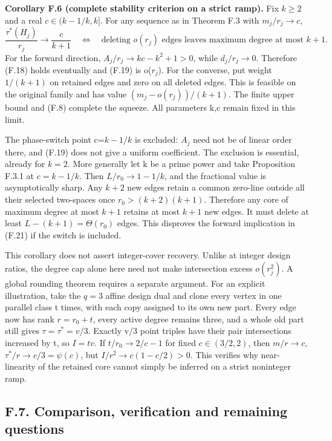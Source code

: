 \documentclass[
  11pt,
]{article}
\begin{document}
\textbf{Corollary F.6 (complete stability criterion on a strict ramp).}
Fix \(k\ge2\) and a real \(c\in(k-1/k,k]\). For any sequence as in
Theorem F.3 with \(m_j/r_j\to c\), \[
 \frac{\tau^*(H_j)}{r_j}\longrightarrow\frac{c}{k+1}
 \quad\Longleftrightarrow\quad
 \text{deleting }o(r_j)\text{ edges leaves maximum degree at most }k+1.
                                                               \tag{F.21}
\] For the forward direction, \(A_j/r_j\to kc-k^2+1>0\), while
\(d_j/r_j\to0\). Therefore (F.18) holds eventually and (F.19) is
o(\(r_j\)). For the converse, put weight \(1/(k+1)\) on retained edges
and zero on all deleted edges. This is feasible on the original family
and has value \((m_j-o(r_j))/(k+1)\). The finite upper bound and (F.8)
complete the squeeze. All parameters k,c remain fixed in this limit.

The phase-switch point c=\(k-1/k\) is excluded: \(A_j\) need not be of
linear order there, and (F.19) does not give a uniform coefficient. The
exclusion is essential, already for \(k=2\). More generally let k be a
prime power and take Proposition F.3.1 at \(c=k-1/k\). Then
\(L/r_0\to1-1/k\), and the fractional value is asymptotically sharp. Any
\(k+2\) new edges retain a common zero-line outside all their selected
two-spaces once \(r_0>(k+2)(k+1)\). Therefore any core of maximum degree
at most \(k+1\) retains at most \(k+1\) new edges. It must delete at
least \(L-(k+1)=\Theta(r_0)\) edges. This disproves the forward
implication in (F.21) if the switch is included.

This corollary does not assert integer-cover recovery. Unlike at integer
design ratios, the degree cap alone here need not make intersection
excess \(o(r_j^2)\). A global rounding theorem requires a separate
argument. For an explicit illustration, take the \(q=3\) affine design
dual and clone every vertex in one parallel class t times, with each
copy assigned to its own new part. Every edge now has rank \(r=r_0+t\),
every active degree remains three, and a whole old part still gives
\(\tau=\tau^*=v/3\). Exactly v/3 point triples have their pair
intersections increased by t, so \(I=tv\). If \(t/r_0\to2/c-1\) for
fixed \(c\in(3/2,2)\), then \(m/r\to c\), \(\tau^*/r\to c/3=\psi(c)\),
but \(I/r^2\to c(1-c/2)>0\). This verifies why near-linearity of the
retained core cannot simply be inferred on a strict noninteger ramp.

\subsection{F.7. Comparison, verification and remaining
questions}\label{f.7.-comparison-verification-and-remaining-questions}
\end{document}
